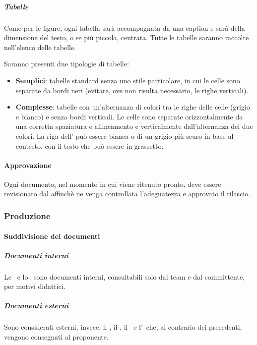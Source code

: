 			\subparagraph{Tabelle}\label{StrumentiDiSupportoTabelle}
			Come per le figure, ogni tabella sarà accompagnata da una caption e sarà della dimensione del testo, o se più piccola, centrata.
			Tutte le tabelle saranno raccolte nell'elenco delle tabelle.\par
			Saranno presenti due tipologie di tabelle:
			\begin{itemize}
				\item \textbf{Semplici}: tabelle standard senza uno stile particolare, in cui le celle sono separate da bordi neri (evitare, ove non risulta necessario,
					le righe verticali).
				\item \textbf{Complesse}: tabelle con un'alternanza di colori tra le righe delle celle (grigio e bianco) e senza bordi verticali.
					Le celle sono separate orizzontalmente da una corretta spaziatura e allineamento e verticalmente dall'alternanza dei due colori.
					La riga dell' può essere bianca o di un grigio più scuro in base al contesto, con il testo che può essere in grassetto.
			\end{itemize}

			\paragraph{Approvazione}	\label{Approvazione}
			Ogni documento, nel momento in cui viene ritenuto pronto, deve essere revisionato dal \Res affinchè ne venga controllata l'adeguatezza e approvato il rilascio.


		\subsubsection{Produzione}

			\paragraph{Suddivisione dei documenti}\label{SuddivisioneDeiDocumenti}

			\subparagraph{Documenti interni}
			Le \NdP\ e lo \SdF\ sono documenti interni, consultabili solo dal team e dal committente, per motivi didattici.

			\subparagraph{Documenti esterni}
			Sono considerati esterni, invece, il \PdPd, il \PdQd, il \Gld\ e l'\AdRd\ che, al contrario dei precedenti, vengono consegnati al proponente.

